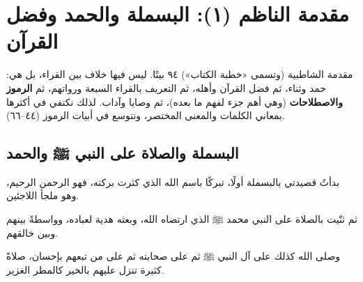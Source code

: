 \chapter{مقدمة الناظم (١): البسملة والحمد وفضل القرآن}

\begin{tanbih}[عن المقدمة]
مقدمة الشاطبية (وتسمى «خطبة الكتاب») ٩٤ بيتًا. ليس فيها خلاف بين القراء، بل هي: حمد وثناء، ثم فضل القرآن وأهله، ثم التعريف بالقراء السبعة ورواتهم، ثم \textbf{الرموز والاصطلاحات} (وهي أهم جزء لفهم ما بعده)، ثم وصايا وآداب.
لذلك نكتفي في أكثرها بمعاني الكلمات والمعنى المختصر، ونتوسع في أبيات الرموز (٤٤–٦٦).
\end{tanbih}

\section{البسملة والصلاة على النبي ﷺ والحمد}

\begin{mufradat}
\end{mufradat}
\maana بدأتُ قصيدتي بالبسملة أولًا، تبركًا باسم الله الذي كثرت بركته، فهو الرحمن الرحيم، وهو ملجأ اللاجئين.

\begin{mufradat}
\end{mufradat}
\maana ثم ثنّيت بالصلاة على النبي محمد ﷺ الذي ارتضاه الله، وبعثه هدية لعباده، وواسطةً بينهم وبين خالقهم.

\begin{mufradat}
\end{mufradat}
\maana وصلى الله كذلك على آل النبي ﷺ ثم على صحابته ثم على من تبعهم بإحسان، صلاةً كثيرة تنزل عليهم بالخير كالمطر الغزير.

